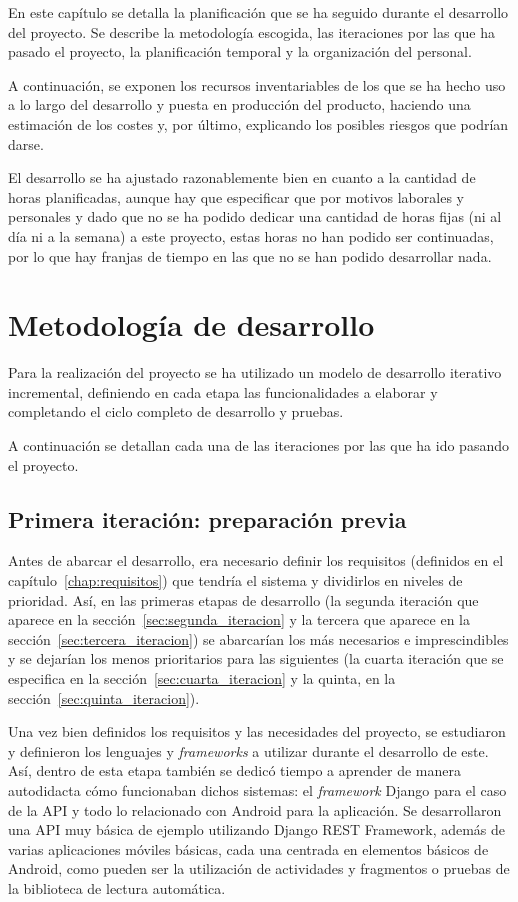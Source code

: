 En este capítulo se detalla la planificación que se ha seguido durante el
desarrollo del proyecto. Se describe la metodología escogida, las iteraciones
por las que ha pasado el proyecto, la planificación temporal y la organización
del personal.

A continuación, se exponen los recursos inventariables de los que se ha hecho
uso a lo largo del desarrollo y puesta en producción del producto, haciendo una
estimación de los costes y, por último, explicando los posibles riesgos que
podrían darse.

El desarrollo se ha ajustado razonablemente bien en cuanto a la
cantidad de horas planificadas, aunque hay que especificar que por motivos
laborales y personales y dado que no se ha podido dedicar una cantidad de horas
fijas (ni al día ni a la semana) a este proyecto, estas horas no han podido ser
continuadas, por lo que hay franjas de tiempo en las que no se han podido
desarrollar nada.

\section{Metodología de desarrollo}

Para la realización del proyecto se ha utilizado un modelo de desarrollo
iterativo incremental, definiendo en cada etapa las funcionalidades a
elaborar y completando el ciclo completo de desarrollo y pruebas. 

A continuación se detallan cada una de las iteraciones por las que ha ido
pasando el proyecto.

\subsection{Primera iteración: preparación previa}
\label{sec:primera_iteracion}

Antes de abarcar el desarrollo, era necesario definir los requisitos (definidos
en el capítulo~\ref{chap:requisitos}) que tendría el sistema y dividirlos en
niveles de prioridad. Así, en las primeras etapas de desarrollo (la segunda
iteración que aparece en la sección~\ref{sec:segunda_iteracion} y la tercera que
aparece en la sección~\ref{sec:tercera_iteracion}) se abarcarían los más
necesarios e imprescindibles y se dejarían los menos prioritarios para las
siguientes (la cuarta iteración que se especifica en la
sección~\ref{sec:cuarta_iteracion} y la quinta, en la
sección~\ref{sec:quinta_iteracion}).

Una vez bien definidos los requisitos y las necesidades del proyecto, se
estudiaron y definieron los lenguajes y \textit{frameworks} a utilizar durante
el desarrollo de este. Así, dentro de esta etapa también se dedicó tiempo a
aprender de manera autodidacta cómo funcionaban dichos sistemas: el
\textit{framework} Django para el caso de la API y todo lo relacionado con
Android para la aplicación. Se desarrollaron una API muy básica de ejemplo
utilizando Django REST Framework, además de varias aplicaciones móviles básicas,
cada una centrada en elementos básicos de Android, como pueden ser la
utilización de actividades y fragmentos o pruebas de la biblioteca de lectura
automática.

